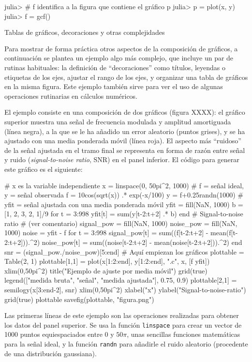 ﻿\documentclass{article}
\newcommand{\code}{\texttt}
\begin{document}
julia> # f identifica a la figura que contiene el gráfico p
julia> p = plot(x, y)
julia> f = gcf()


Tablas de gráficos, decoraciones y otras complejidades

Para mostrar de forma práctica otros aspectos de la composición de gráficos, a continuación se plantea un ejemplo algo más complejo, que incluye un par de rutinas habituales: la definición de ``decoraciones'' como títulos, leyendas o etiquetas de los ejes, ajustar el rango de los ejes, y organizar una tabla de gráficos en la misma figura. Este ejemplo también sirve para ver el uso de algunas operaciones rutinarias en cálculos numéricos.

El ejemplo consiste en una composición de dos gráficos (figura XXXX): el gráfico superior muestra una señal de frecuencia modulada y amplitud amortiguada (línea negra), a la que se le ha añadido un error aleatorio (puntos grises), y se ha ajustado con una media ponderada móvil (línea roja). El aspecto más ``ruidoso'' de la señal ajustada en el tramo final se representa en forma de razón entre señal y ruido (\emph{signal-to-noise ratio}, SNR) en el panel inferior. El código para generar este gráfico es el siguiente:

# x es la variable independiente
x = linspace(0, 50pi^2, 1000)
# f = señal ideal, y = señal observada
f = 10cos(sqrt(x)) .* exp(-x/100)
y = f+0.25randn(1000)
# yfit = señal ajustada con una media ponderada móvil
yfit = fill(NaN, 1000)
b = [1, 2, 3, 2, 1]/9
for t = 3:998
  yfit[t] = sum(y[t-2:t+2] .* b)
end
# Signal-to-noise ratio
# (ver comentario)
signal_pow = fill(NaN, 1000)
noise_pow = fill(NaN, 1000)
noise = yfit - f
for t = 3:998
  signal_pow[t] = sum((f[t-2:t+2] - mean(f[t-2:t+2])).^2)
  noise_pow[t] = sum((noise[t-2:t+2] - mean(noise[t-2:t+2])).^2)
end
snr = (signal_pow./noise_pow)[5:end]
# Aquí empiezan los gráficos
plottable = Table(2, 1)
plottable[1,1] = plot(x[1:2:end], y[1:2:end], ".c", x, [f yfit])
xlim(0,50pi^2)
title("Ejemplo de ajuste por media móvil")
grid(true)
legend(["medida bruta", "señal", "medida ajustada"], 0.75, 0.9)
plottable[2,1] = semilogy(x[3:end-2], snr)
xlim(0,50pi^2)
xlabel("x")
ylabel("Signal-to-noise-ratio")
grid(true)
plottable
savefig(plottable, "figura.png")

Las primeras líneas de este ejemplo son las operaciones realizadas para obtener los datos del panel superior. Se usa la función \code{linspace} para crear un vector de 1000 puntos equiespaciados entre $0$ y $50\pi$, unas sencillas funciones matemáticas para la señal ideal, y la función \code{randn} para añadirle el ruido aleatorio (procedente de una distribución gaussiana).
\end{document}

